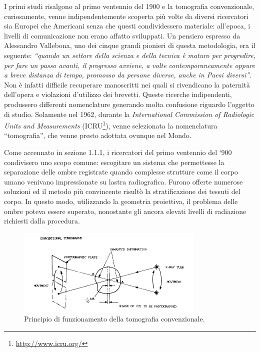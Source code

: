 \documentclass[a4paper,11pt, oneside]{article}
\begin{document}
                    \par
                        I primi studi risalgono al primo ventennio del 1900 e la tomografia convenzionale, curiosamente, venne indipendentemente scoperta più volte da diversi ricercatori sia Europei che Americani senza che questi condividessero materiale: all'epoca, i livelli di comunicazione non erano affatto sviluppati. Un pensiero espresso da Alessandro Vallebona, uno dei cinque grandi pionieri di questa metodologia, era il seguente: \textit{“quando un settore della scienza e della tecnica è maturo per progredire, per fare un passo avanti, il progresso avviene, a volte contemporaneamente oppure a breve distanza di tempo, promosso da persone diverse, anche in Paesi diversi”}\cite{vallebona-pensiero}.
                        Non è infatti difficile recuperare manoscritti nei quali si rivendicano la paternità dell'opera e violazioni d'utilizzo dei brevetti\cite{vallebona-difesa}. Queste ricerche indipendenti, produssero differenti nomenclature generando molta confusione riguardo l'oggetto di studio. Solamente nel 1962, durante la \textit{International Commission of Radiologic Units and Measurements} (ICRU\footnote{\url{http://www.icru.org/}}), venne selezionata la nomenclatura “tomografia”, che venne presto adottata ovunque nel Mondo.
                        
                    \par
                        Come accennato in sezione 1.1.1, i ricercatori del primo ventennio del ‘900 condivisero uno scopo comune: escogitare un sistema che permettesse la separazione delle ombre registrate quando complesse strutture come il corpo umano venivano impressionate su lastra radiografica. Furono offerte numerose soluzioni ed il metodo più convincente risultò la stratificazione dei tessuti del corpo. In questo modo, utilizzando la geometria proiettiva, il problema delle ombre poteva essere superato, nonostante gli ancora elevati livelli di radiazione richiesti dalla procedura.
                        
                        \begin{figure}[h]
                            \centering
                            \includegraphics[width=0.8\textwidth]{conventional}
                            \caption{Principio di funzionamento della tomografia convenzionale.}
                            \label{fig:conventional}
                        \end{figure}
                        
\end{document}
